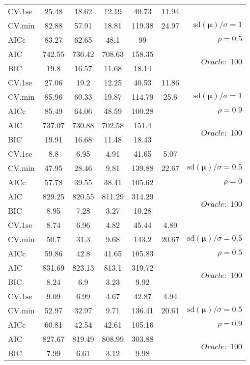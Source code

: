 \begin{table}
\begin{center}
\begin{tabular}{l*{5}{c}|r}
 \hline 
CV.1se & 25.48 & 18.62 & 12.19 & 40.73 & 11.94 & \\
CV.min & 82.88 & 57.91 & 18.81 & 119.38 & 24.97 &  $\mathrm{sd}(\mathbf{\mu})/\sigma=1$ \\
AICc & 83.27 & 62.65 & 48.1 & 99 & & $\rho=0.5$ \\
AIC & 742.55 & 736.42 & 708.63 & 158.35 & &  \multirow{2}{*}{$Oracle: $ 100} \\
BIC & 19.8 & 16.57 & 11.68 & 18.14 & &  \\
 \hline 
CV.1se & 27.06 & 19.2 & 12.25 & 40.53 & 11.86 & \\
CV.min & 85.96 & 60.33 & 19.87 & 114.79 & 25.6 &  $\mathrm{sd}(\mathbf{\mu})/\sigma=1$ \\
AICc & 85.49 & 64.06 & 48.59 & 100.28 & & $\rho=0.9$ \\
AIC & 737.07 & 730.88 & 702.58 & 151.4 & &  \multirow{2}{*}{$Oracle: $ 100} \\
BIC & 19.91 & 16.68 & 11.48 & 18.43 & &  \\
 \hline 
CV.1se & 8.8 & 6.95 & 4.91 & 41.65 & 5.07 & \\
CV.min & 47.95 & 28.46 & 9.81 & 139.88 & 22.67 &  $\mathrm{sd}(\mathbf{\mu})/\sigma=0.5$ \\
AICc & 57.78 & 39.55 & 38.41 & 105.62 & & $\rho=0$ \\
AIC & 829.25 & 820.55 & 811.29 & 314.29 & &  \multirow{2}{*}{$Oracle: $ 100} \\
BIC & 8.95 & 7.28 & 3.27 & 10.28 & &  \\
 \hline 
CV.1se & 8.74 & 6.96 & 4.82 & 45.44 & 4.89 & \\
CV.min & 50.7 & 31.3 & 9.68 & 143.2 & 20.67 &  $\mathrm{sd}(\mathbf{\mu})/\sigma=0.5$ \\
AICc & 59.86 & 42.8 & 41.65 & 105.83 & & $\rho=0.5$ \\
AIC & 831.69 & 823.13 & 813.1 & 319.72 & &  \multirow{2}{*}{$Oracle: $ 100} \\
BIC & 8.24 & 6.9 & 3.23 & 9.92 & &  \\
 \hline 
CV.1se & 9.09 & 6.99 & 4.67 & 42.87 & 4.94 & \\
CV.min & 52.97 & 32.97 & 9.71 & 136.41 & 20.61 &  $\mathrm{sd}(\mathbf{\mu})/\sigma=0.5$ \\
AICc & 60.81 & 42.54 & 42.61 & 105.16 & & $\rho=0.9$ \\
AIC & 827.67 & 819.49 & 808.99 & 303.88 & &  \multirow{2}{*}{$Oracle: $ 100} \\
BIC & 7.99 & 6.61 & 3.12 & 9.98 & &  \\
 \hline 
\end{tabular}
\end{center}
\vspace{-1cm}
\end{table}





